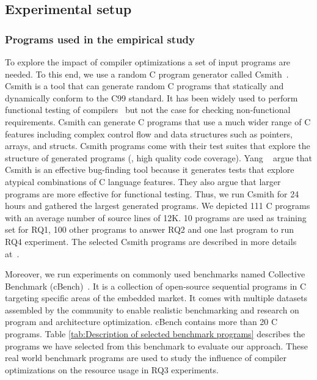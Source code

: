 \subsection{Experimental setup}
\subsubsection{Programs used in the empirical study}
To explore the impact of compiler optimizations a set of input programs are needed. 
To this end, we use a random C program generator called Csmith~\cite{yang2011finding}.
Csmith is a tool that can generate random C programs that statically and dynamically conform to the C99 standard. It has been widely used to perform functional testing of compilers~\cite{chen2016empirical,le2014compiler,nagai2013scaling} but not the case for checking non-functional requirements. Csmith can generate C programs that use a much wider range of C features including complex control flow and data structures such as pointers, arrays, and structs. 
Csmith programs come with their test suites that explore the structure of generated programs (\ie, high quality code coverage).
Yang \etal~\cite{yang2011finding} argue that Csmith is an effective bug-finding tool because it generates tests that explore atypical combinations of C language features. They also argue that larger programs are more effective for functional testing. 
Thus, we run Csmith for 24 hours and gathered the largest generated programs. We depicted 111 C programs with an average number of source lines of 12K. 10 programs are used as training set for RQ1, 100 other programs to answer RQ2 and one last program to run RQ4 experiment.
The selected Csmith programs are described in more details at~\cite{mboussaa}.



Moreover, we run experiments on commonly used benchmarks named Collective Benchmark (cBench)~\cite{fursin2009collective}. It is a collection of open-source sequential programs in C targeting specific areas of the embedded market. It comes with multiple datasets assembled by the community to enable realistic benchmarking and research on program and architecture optimization. cBench contains more than 20 C programs. Table \ref{tab:Description of selected benchmark programs} describes the programs we have selected from this benchmark to evaluate our approach.
These real world benchmark programs are used to study the influence of compiler optimizations on the resource usage in RQ3 experiments.
 
